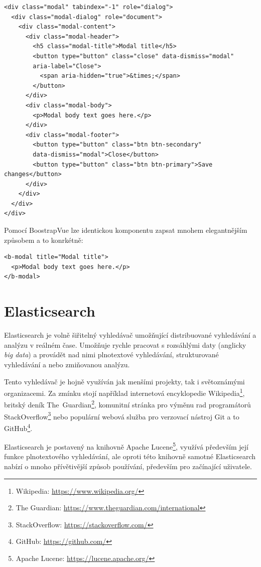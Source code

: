 \begin{verbatim}
<div class="modal" tabindex="-1" role="dialog">
  <div class="modal-dialog" role="document">
    <div class="modal-content">
      <div class="modal-header">
        <h5 class="modal-title">Modal title</h5>
        <button type="button" class="close" data-dismiss="modal"
        aria-label="Close">
          <span aria-hidden="true">&times;</span>
        </button>
      </div>
      <div class="modal-body">
        <p>Modal body text goes here.</p>
      </div>
      <div class="modal-footer">
        <button type="button" class="btn btn-secondary"
        data-dismiss="modal">Close</button>
        <button type="button" class="btn btn-primary">Save changes</button>
      </div>
    </div>
  </div>
</div>
\end{verbatim}

Pomocí BoostrapVue lze identickou komponentu zapsat mnohem elegantnějším způsobem a to konrkétně:

\begin{verbatim}
<b-modal title="Modal title">
  <p>Modal body text goes here.</p>
</b-modal>
\end{verbatim}

\section{Elasticsearch}
Elasticsearch je volně šiřitelný vyhledávač umožňující distribuované vyhledávání a analýzu v reálném čase. Umožňuje rychle pracovat s rozsáhlými daty (anglicky \emph{big data}) a provádět nad nimi plnotextové vyhledávání, strukturované vyhledávání a nebo zmiňovanou analýzu.

Tento vyhledávač je hojně využíván jak menšími projekty, tak i světoznámými organizacemi. Za zmínku stojí například internetová encyklopedie Wikipedia\footnote{Wikipedia: \url{https://www.wikipedia.org/}}, britský deník The~Guardian\footnote{The Guardian: \url{https://www.theguardian.com/international}}, komunitní stránka pro výměnu rad programátorů StackOverflow\footnote{StackOverflow: \url{https://stackoverflow.com/}} nebo populární webová služba pro verzovací nástroj Git a to GitHub\footnote{GitHub: \url{https://github.com/}}.

Elasticsearch je postavený na knihovně Apache Lucene\footnote{Apache Lucene: \url{https://lucene.apache.org/}}, využívá především její funkce plnotextového vyhledávání, ale oproti této knihovně samotné Elasticsearch nabízí o mnoho přívětivější způsob používání, především pro začínající uživatele. 

